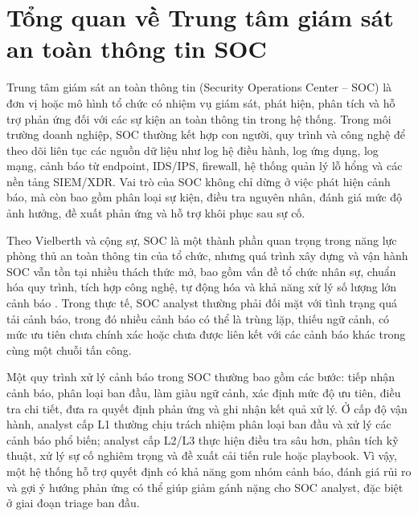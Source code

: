 \documentclass[a4paper,12pt,oneside]{book}
\begin{document}
\section{Tổng quan về Trung tâm giám sát an toàn thông tin SOC}
{\fontsize{13pt}{15.6pt}\selectfont

Trung tâm giám sát an toàn thông tin (Security Operations Center -- SOC) là đơn vị hoặc mô hình tổ chức có nhiệm vụ giám sát, phát hiện, phân tích và hỗ trợ phản ứng đối với các sự kiện an toàn thông tin trong hệ thống. Trong môi trường doanh nghiệp, SOC thường kết hợp con người, quy trình và công nghệ để theo dõi liên tục các nguồn dữ liệu như log hệ điều hành, log ứng dụng, log mạng, cảnh báo từ endpoint, IDS/IPS, firewall, hệ thống quản lý lỗ hổng và các nền tảng SIEM/XDR. Vai trò của SOC không chỉ dừng ở việc phát hiện cảnh báo, mà còn bao gồm phân loại sự kiện, điều tra nguyên nhân, đánh giá mức độ ảnh hưởng, đề xuất phản ứng và hỗ trợ khôi phục sau sự cố.

\noindent Theo Vielberth và cộng sự, SOC là một thành phần quan trọng trong năng lực phòng thủ an toàn thông tin của tổ chức, nhưng quá trình xây dựng và vận hành SOC vẫn tồn tại nhiều thách thức mở, bao gồm vấn đề tổ chức nhân sự, chuẩn hóa quy trình, tích hợp công nghệ, tự động hóa và khả năng xử lý số lượng lớn cảnh báo \cite{vielberth2020soc}. Trong thực tế, SOC analyst thường phải đối mặt với tình trạng quá tải cảnh báo, trong đó nhiều cảnh báo có thể là trùng lặp, thiếu ngữ cảnh, có mức ưu tiên chưa chính xác hoặc chưa được liên kết với các cảnh báo khác trong cùng một chuỗi tấn công.

\noindent Một quy trình xử lý cảnh báo trong SOC thường bao gồm các bước: tiếp nhận cảnh báo, phân loại ban đầu, làm giàu ngữ cảnh, xác định mức độ ưu tiên, điều tra chi tiết, đưa ra quyết định phản ứng và ghi nhận kết quả xử lý. Ở cấp độ vận hành, analyst cấp L1 thường chịu trách nhiệm phân loại ban đầu và xử lý các cảnh báo phổ biến; analyst cấp L2/L3 thực hiện điều tra sâu hơn, phân tích kỹ thuật, xử lý sự cố nghiêm trọng và đề xuất cải tiến rule hoặc playbook. Vì vậy, một hệ thống hỗ trợ quyết định có khả năng gom nhóm cảnh báo, đánh giá rủi ro và gợi ý hướng phản ứng có thể giúp giảm gánh nặng cho SOC analyst, đặc biệt ở giai đoạn triage ban đầu.

}
\end{document}
